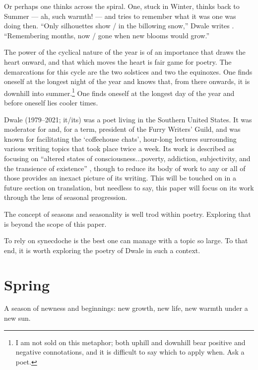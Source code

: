 \documentclass[12pt,oneside]{memoir}
\begin{document}
Or perhaps one thinks across the spiral. One, stuck in Winter, thinks back to Summer --- ah, such warmth! --- and tries to remember what it was one was doing then. ``Only silhouettes show / in the billowing snow,'' Dwale writes \parencite[19]{leaves}. ``Remembering months, now / gone when new blooms would grow.''

The power of the cyclical nature of the year is of an importance that draws the heart onward, and that which moves the heart is fair game for poetry. The demarcations for this cycle are the two solstices and two the equinoxes. One finds oneself at the longest night of the year and knows that, from there onwards, it is downhill into summer.\footnote{I am not sold on this metaphor; both uphill and downhill bear positive and negative connotations, and it is difficult to say which to apply when. Ask a poet.} One finds oneself at the longest day of the year and before oneself lies cooler times.

Dwale (1979--2021; it/its) was a poet living in the Southern United States. It was moderator for and, for a term, president of the Furry Writers' Guild, and was known for facilitating the `coffeehouse chats', hour-long lectures surrounding various writing topics that took place twice a week. Its work is described as focusing on ``altered states of consciousness...poverty, addiction, subjectivity, and the transience of existence'' \parencite{dwale}, though to reduce its body of work to any or all of those provides an inexact picture of its writing. This will be touched on in a future section on translation, but needless to say, this paper will focus on its work through the lens of seasonal progression. 

The concept of seasons and seasonality is well trod within poetry. Exploring that is beyond the scope of this paper.
\begin{comment}
\footnote{Or perhaps my abilities as a writer}
\end{comment}
To rely on synecdoche is the best one can manage with a topic so large. To that end, it is worth exploring the poetry of Dwale in such a context.

\clearpage

\section*{Spring}

A season of newness and beginnings: new growth, new life, new warmth under a new sun.
\end{document}

